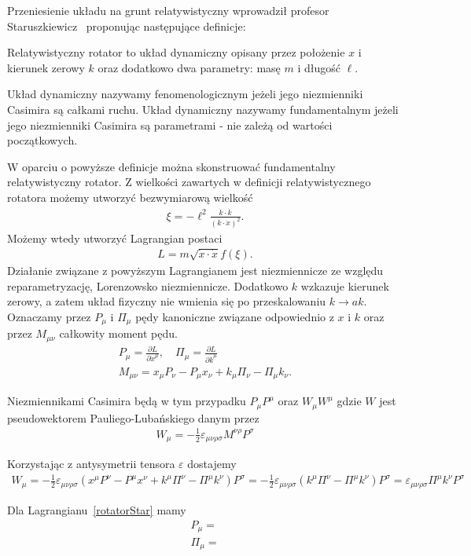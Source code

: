 Przeniesienie układu na grunt relatywistyczny wprowadził 
profesor Staruszkiewicz~\cite{star2008} proponując następujące 
definicje:
\begin{definition}
Relatywistyczny rotator to układ dynamiczny
 opisany przez położenie $x$ i kierunek
zerowy $k$ oraz dodatkowo dwa parametry: masę $m$ i długość $\ell$.
\end{definition}
\begin{definition}
Układ dynamiczny  nazywamy fenomenologicznym jeżeli jego niezmienniki Casimira są 
całkami ruchu. Układ dynamiczny nazywamy fundamentalnym jeżeli jego niezmienniki
Casimira są parametrami - nie zależą od wartości początkowych.
\end{definition}
W oparciu o powyższe definicje można skonstruować fundamentalny
relatywistyczny rotator. Z wielkości zawartych w definicji relatywistycznego 
rotatora możemy utworzyć bezwymiarową wielkość
\begin{align}
\xi = - \ell^2 \frac{\dot{k} \cdot \dot{k}}{ ( k \cdot \dot{x})^2 }.
\end{align}
Możemy wtedy utworzyć Lagrangian postaci
\begin{align}\label{rotatorStar}
L = m \sqrt{ \dot{x} \cdot \dot{x} } f( \xi ) .
\end{align}
Działanie związane z powyższym Lagrangianem 
jest niezmiennicze ze względu reparametryzację, 
Lorenzowsko niezmiennicze. Dodatkowo $k$ wzkazuje kierunek zerowy, a zatem
 układ fizyczny nie wmienia się
po przeskalowaniu $k \to a k$. 
Oznaczamy przez $P_\mu$ i $\Pi_\mu$ pędy kanoniczne związane 
odpowiednio z $x$ i $k$ oraz przez $M_{\mu\nu}$ całkowity moment pędu.
\begin{align}
P_\mu = \frac{\partial L}{\partial \dot{x}^\mu}, \quad
\Pi_\mu = \frac{\partial L}{\partial \dot{k}^\mu} \\
M_{\mu\nu} = x_\mu P_\nu - P_\mu x_\nu + k_\mu \Pi_\nu - \Pi_\mu k_\nu.
\end{align}

Niezmiennikami Casimira będą w tym przypadku $P_\mu P^\mu$ oraz
$W_\mu W^\mu$ gdzie $W$ jest pseudowektorem Pauliego-Lubańskiego 
danym przez
\begin{align}
W_\mu = - \frac{1}{2} \varepsilon_{\mu\nu\rho\sigma}
M^{\nu\rho} P^\sigma
\end{align}

Korzystając z antysymetrii tensora $\varepsilon$ dostajemy
\begin{align}
W_\mu = - \frac{1}{2} \varepsilon_{\mu\nu\rho\sigma}
(x^\mu P^\nu - P^\mu x^\nu + k^\mu \Pi^\nu - \Pi^\mu k^\nu) P^\sigma = 
 - \frac{1}{2} \varepsilon_{\mu\nu\rho\sigma}
( k^\mu \Pi^\nu - \Pi^\mu k^\nu) P^\sigma = 
  \varepsilon_{\mu\nu\rho\sigma}
 \Pi^\mu k^\nu P^\sigma
\end{align}

Dla Lagrangianu~\ref{rotatorStar} mamy 
\begin{align}
P_\mu = \\
\Pi_\mu = 
\end{align}



